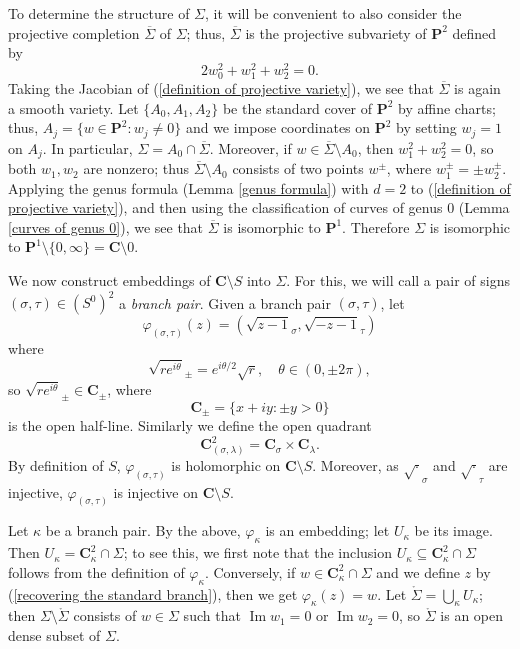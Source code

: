 \documentclass[reqno,12pt,letterpaper]{amsart}
\newcommand{\CC}{\mathbf{C}}
\newcommand{\PP}{\mathbf P}
\newcommand{\dfn}[1]{\emph{#1}\index{#1}}
\renewcommand{\Im}{\operatorname{Im}}
\theoremstyle{definition}
\begin{document}
To determine the structure of $\Sigma$, it will be convenient to also consider the projective completion $\overline \Sigma$ of $\Sigma$; thus, $\overline \Sigma$ is the projective subvariety of $\PP^2$ defined by
\begin{equation}
\label{definition of projective variety}
2w_0^2 + w_1^2 + w_2^2 = 0.
\end{equation}
Taking the Jacobian of (\ref{definition of projective variety}), we see that $\overline \Sigma$ is again a smooth variety.
Let $\{A_0, A_1, A_2\}$ be the standard cover of $\PP^2$ by affine charts; thus, $A_j = \{w \in \PP^2: w_j \neq 0\}$ and we impose coordinates on $\PP^2$ by setting $w_j = 1$ on $A_j$.
In particular, $\Sigma = A_0 \cap \overline \Sigma$.
Moreover, if $w \in \overline \Sigma \setminus A_0$, then $w_1^2 + w_2^2 = 0$, so both $w_1,w_2$ are nonzero; thus $\overline \Sigma \setminus A_0$ consists of two points $w^\pm$, where $w^\pm_1 = \pm w^\pm_2$.
Applying the genus formula (Lemma \ref{genus formula}) with $d = 2$ to (\ref{definition of projective variety}), and then using the classification of curves of genus $0$ (Lemma \ref{curves of genus 0}), we see that $\overline \Sigma$ is isomorphic to $\PP^1$.
Therefore $\Sigma$ is isomorphic to $\PP^1 \setminus \{0, \infty\} = \CC \setminus 0$.

We now construct embeddings of $\CC \setminus S$ into $\Sigma$.
For this, we will call a pair of signs $(\sigma, \tau) \in (S^0)^2$ a \dfn{branch pair}.
Given a branch pair $(\sigma, \tau)$, let
$$\varphi_{(\sigma, \tau)}(z) = (\sqrt{z-1}_\sigma, \sqrt{-z-1}_\tau)$$
where
$$\sqrt{re^{i\theta}}_\pm = e^{i\theta/2}\sqrt r,\quad\theta \in (0, \pm 2\pi),$$
so $\sqrt{re^{i\theta}}_\pm \in \CC_\pm$, where
$$\CC_\pm = \{x + iy: \pm y > 0\}$$
is the open half-line.
Similarly we define the open quadrant
$$\CC^2_{(\sigma, \lambda)} = \CC_\sigma \times \CC_\lambda.$$
By definition of $S$, $\varphi_{(\sigma, \tau)}$ is holomorphic on $\CC \setminus S$.
Moreover, as $\sqrt \cdot_\sigma$ and $\sqrt\cdot_\tau$ are injective, $\varphi_{(\sigma, \tau)}$ is injective on $\CC \setminus S$.

Let $\kappa$ be a branch pair. By the above, $\varphi_\kappa$ is an embedding; let $U_\kappa$ be its image.
Then $U_\kappa = \CC^2_\kappa \cap \Sigma$; to see this, we first note that the inclusion $U_\kappa \subseteq\CC^2_\kappa \cap \Sigma $ follows from the definition of $\varphi_\kappa$.
Conversely, if $w \in \CC^2_\kappa \cap \Sigma$ and we define $z$ by (\ref{recovering the standard branch}), then we get $\varphi_\kappa(z) = w$.
Let $\mathring \Sigma = \bigcup_\kappa U_\kappa$; then $\Sigma \setminus \mathring \Sigma$ consists of $w \in \Sigma$ such that $\Im w_1 = 0$ or $\Im w_2 = 0$, so $\mathring \Sigma$ is an open dense subset of $\Sigma$.
\end{document}
